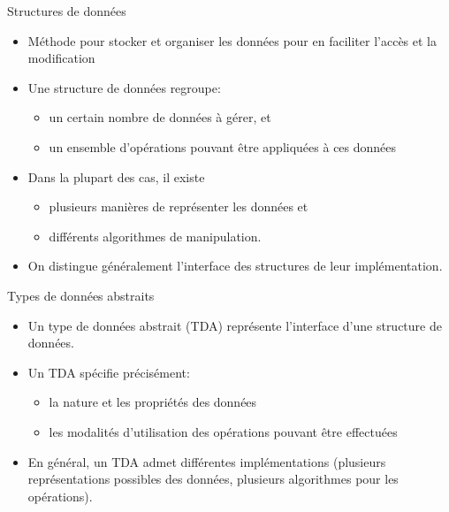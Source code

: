\begin{frame}{Structures de données}

\begin{itemize}
\item Méthode pour stocker et organiser les données pour en faciliter
  l'accès et la modification
\item Une structure de données regroupe:
\begin{itemize}
\item un certain nombre de données à gérer, et
\item un ensemble d'opérations pouvant être appliquées à ces données
\end{itemize}
\item Dans la plupart des cas, il existe
\begin{itemize}
\item plusieurs manières de représenter les données et
\item différents algorithmes de manipulation.
\end{itemize}
\item On distingue généralement l'\alert{interface} des structures de
  leur \alert{implémentation}.
\end{itemize}

\end{frame}

\begin{frame}{Types de données abstraits}

\begin{itemize}
\item Un type de données abstrait (TDA) représente l'interface d'une structure de données.
\item Un TDA spécifie précisément:
\begin{itemize}
\item la nature et les propriétés des données
\item les modalités d'utilisation des opérations pouvant être effectuées
\end{itemize}
\item En général, un TDA admet différentes implémentations (plusieurs représentations possibles des données, plusieurs algorithmes pour les opérations).
\end{itemize}

\end{frame}

